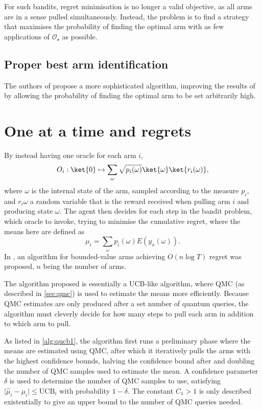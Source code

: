 For such bandits, regret minimisation is no longer a valid objective, as all arms are in a sense pulled simultaneously.
Instead, the problem is to find a strategy that maximises the probability of finding the optimal arm with as few applications of $\mathcal{O_e}$ as possible.

\subsection{Proper best arm identification}
The authors of \cite{wang2021} propose a more sophisticated algorithm, improving the results of \cite{casale2020} by allowing the probability of finding the optimal arm to be set arbitrarily high.

\section{One at a time and regrets}
By instead having one oracle for each arm $i$,
\begin{equation}
    O_i: \ket{0} \mapsto \sum_\omega \sqrt{p_i(\omega)} \ket{\omega} \ket{r_i(\omega)},
    \label{eq:wan_oracle}
\end{equation}
where $\omega$ is the internal state of the arm, sampled according to the measure $p_i$, and $r_i{\omega}$ a random variable that is the reward received when pulling arm $i$ and producing state $\omega$.
The agent then decides for each step in the bandit problem, which oracle to invoke, trying to minimise the cumulative regret, where the means here are defined as
\begin{equation}
    \mu_i = \sum_\omega p_i(\omega) E(y_x(\omega)).
\end{equation}
In \cite{wan2022}, an algorithm for bounded-value arms achieving $O(n \log T)$ regret was proposed, $n$ being the number of arms.

The algorithm proposed is essentially a UCB-like algorithm, where QMC (as described in \cref{sec:qmc}) is used to estimate the means more efficiently.
Because QMC estimates are only produced after a set number of quantum queries, the algorithm must cleverly decide for how many steps to pull each arm in addition to which arm to pull.

As listed in \cref{alg:qucb1}, the algorithm first runs a preliminary phase where the means are estimated using QMC, after which it iteratively pulls the arms with the highest confidence bounds, halving the confidence bound after and doubling the number of QMC samples used to estimate the mean.
A confidence parameter $\delta$ is used to determine the number of QMC samples to use, satisfying $\lvert\hat{\mu}_i - \mu_i\rvert \leq \text{UCB}_i$ with probability $1-\delta$.
The constant $C_1>1$ is only described existentially to give an upper bound to the number of QMC queries needed.

